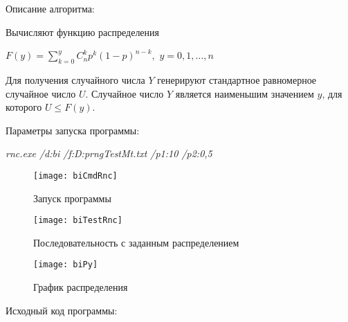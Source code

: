 \documentclass[bachelor, och, coursework]{shiza}
\begin{document}
	Описание алгоритма:

	Вычисляют функцию распределения
	
	\begin{center}
	$F(y) = \sum_{k=0}^{y} C_n^k  p^k (1-p)^{n-k},$ $ y = 0, 1, \dots , n$
	\end{center}
	
	Для получения случайного числа $Y$ генерируют стандартное равномерное случайное число $U$. Случайное число $Y$ является наименьшим значением $y$, для которого $U \leq F(y)$. \
	
	Параметры запуска программы:
	
	\textit{rnc.exe /d:bi /f:D:prngTestMt.txt /p1:10 /p2:0,5}
	
	
	\begin{figure}[H]
		\centering
		\texttt{[image: biCmdRnc]}
		\caption{Запуск программы}
		\label{fig:biCmdRnc}
	\end{figure}
	
	\begin{figure}[H]
		\centering
		\texttt{[image: biTestRnc]}
		\caption{Последовательность с заданным распределением}
		\label{fig:biTestRnc}
	\end{figure}
	
	\begin{figure}[H]
		\centering
		\texttt{[image: biPy]}
		\caption{График распределения}
		\label{fig:biPy}
	\end{figure}
	
	Исходный код программы:
	
\end{document}
